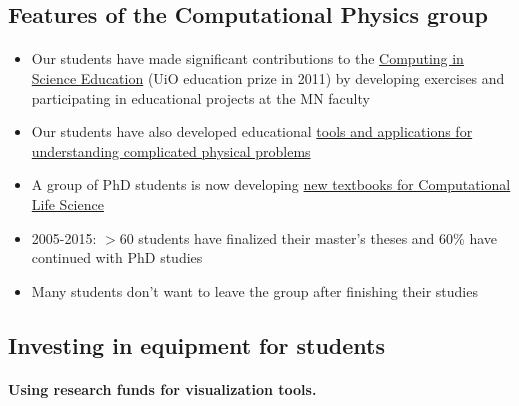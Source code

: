 \documentclass[%
oneside,                 %
final,                   %
10pt]{article}
\begin{document}
\noindent





\subsection{Features of the Computational Physics group}

\paragraph{}
\begin{itemize}
\item Our students have made significant contributions to  the \href{{http://www.mn.uio.no/english/about/collaboration/cse/}}{Computing in Science Education}  (UiO education prize in 2011) by developing exercises and participating in educational projects at the MN faculty

\item Our students have also developed educational \href{{http://www.mn.uio.no/fysikk/om/aktuelt/aktuelle-saker/2015/realfagsapper.html}}{tools and applications for understanding complicated physical problems}

\item A group of PhD students is now developing \href{{https://github.com/CINPLA/ibvcse}}{new textbooks for Computational Life Science}

\item 2005-2015: $> 60$ students have finalized their master's theses and 60\% have continued with PhD studies

\item Many students don't want to leave the group after finishing their studies
\end{itemize}

\noindent






\subsection{Investing in equipment for students}

\paragraph{Using research funds for visualization tools.}
\end{document}
